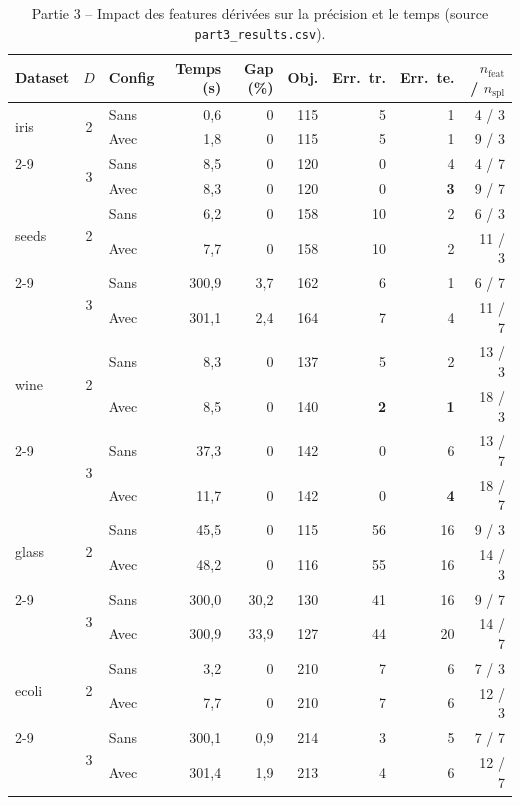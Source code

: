 \documentclass[a4paper,10pt,titlepage,leqno]{article}
\begin{document}
\begin{table}[H]
\centering
\caption{Partie 3 -- Impact des features dérivées sur la précision et le temps (source \texttt{part3\_results.csv}).}
\label{tab:part3}
\small
\begin{tabular}{@{}l c l r r r r r r@{}}
\toprule
Dataset & $D$ & Config & Temps (s) & Gap (\%) & Obj. & Err.\ tr. & Err.\ te. & $n_{\text{feat}}$ / $n_{\text{spl}}$ \\
\midrule
\multirow{2}{*}{iris} & \multirow{2}{*}{2} & Sans & 0{,}6 & 0 & 115 & 5 & 1 & 4 / 3 \\
 & & Avec & 1{,}8 & 0 & 115 & 5 & 1 & 9 / 3 \\
\cmidrule{2-9}
\multirow{2}{*}{} & \multirow{2}{*}{3} & Sans & 8{,}5 & 0 & 120 & 0 & 4 & 4 / 7 \\
 & & Avec & 8{,}3 & 0 & 120 & 0 & \cellcolor{navylight}\textbf{3} & 9 / 7 \\
\midrule
\multirow{2}{*}{seeds} & \multirow{2}{*}{2} & Sans & 6{,}2 & 0 & 158 & 10 & 2 & 6 / 3 \\
 & & Avec & 7{,}7 & 0 & 158 & 10 & 2 & 11 / 3 \\
\cmidrule{2-9}
\multirow{2}{*}{} & \multirow{2}{*}{3} & Sans & 300{,}9 & 3{,}7 & 162 & 6 & 1 & 6 / 7 \\
 & & Avec & 301{,}1 & 2{,}4 & 164 & 7 & 4 & 11 / 7 \\
\midrule
\multirow{2}{*}{wine} & \multirow{2}{*}{2} & Sans & 8{,}3 & 0 & 137 & 5 & 2 & 13 / 3 \\
 & & Avec & 8{,}5 & 0 & 140 & \cellcolor{navylight}\textbf{2} & \cellcolor{navylight}\textbf{1} & 18 / 3 \\
\cmidrule{2-9}
\multirow{2}{*}{} & \multirow{2}{*}{3} & Sans & 37{,}3 & 0 & 142 & 0 & 6 & 13 / 7 \\
 & & Avec & 11{,}7 & 0 & 142 & 0 & \cellcolor{navylight}\textbf{4} & 18 / 7 \\
\midrule
\multirow{2}{*}{glass} & \multirow{2}{*}{2} & Sans & 45{,}5 & 0 & 115 & 56 & 16 & 9 / 3 \\
 & & Avec & 48{,}2 & 0 & 116 & 55 & 16 & 14 / 3 \\
\cmidrule{2-9}
\multirow{2}{*}{} & \multirow{2}{*}{3} & Sans & 300{,}0 & 30{,}2 & 130 & 41 & 16 & 9 / 7 \\
 & & Avec & 300{,}9 & 33{,}9 & 127 & 44 & 20 & 14 / 7 \\
\midrule
\multirow{2}{*}{ecoli} & \multirow{2}{*}{2} & Sans & 3{,}2 & 0 & 210 & 7 & 6 & 7 / 3 \\
 & & Avec & 7{,}7 & 0 & 210 & 7 & 6 & 12 / 3 \\
\cmidrule{2-9}
\multirow{2}{*}{} & \multirow{2}{*}{3} & Sans & 300{,}1 & 0{,}9 & 214 & 3 & 5 & 7 / 7 \\
 & & Avec & 301{,}4 & 1{,}9 & 213 & 4 & 6 & 12 / 7 \\
\bottomrule
\end{tabular}
\end{table}
\end{document}
